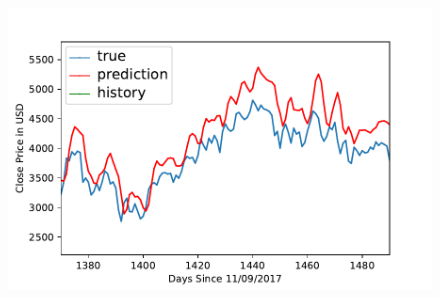 \begin{figure}[p]
\ \
\begin{minipage}{.4\textwidth}
\includegraphics[width=1.0\textwidth]{images/ETH-USD-prediction-model-zoomed.pdf}
\end{minipage}


\end{figure}
